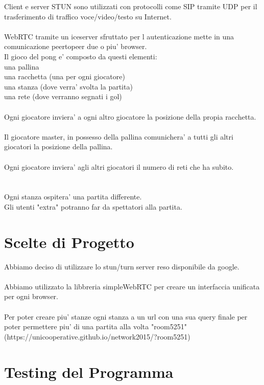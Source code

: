 \documentclass[11pt, a4paper, titlepage, block]{article}
\begin{document}
Client e server STUN sono utilizzati con protocolli come SIP tramite UDP per il trasferimento di traffico voce/video/testo su Internet.\\
\\

WebRTC tramite un iceserver sfruttato per l autenticazione mette in una comunicazione peertopeer due o piu' browser.\\
Il gioco del pong e' composto da questi elementi:\\
una pallina\\
una racchetta (una per ogni giocatore)\\
una stanza (dove verra' svolta la partita)\\
una rete (dove verranno segnati i gol)\\
\\
Ogni giocatore inviera' a ogni altro giocatore la posizione della propia racchetta.\\
\\
Il giocatore master, in possesso della pallina comunichera' a tutti gli altri giocatori la posizione della pallina.\\
\\
Ogni giocatore inviera' agli altri giocatori il numero di reti che ha subito.\\
\\
\\
Ogni stanza ospitera' una partita differente.\\
Gli utenti "extra" potranno far da spettatori alla partita.\\

\section{Scelte di Progetto}
	Abbiamo deciso di utilizzare lo stun/turn server reso disponibile da google.\\
	\\
	Abbiamo utilizzato la libbreria simpleWebRTC per creare un interfaccia unificata per ogni browser.\\
	\\
	Per poter creare piu' stanze ogni stanza a un url con una sua query finale per poter permettere piu' di una 	partita alla volta "room5251"\\ (https://unicooperative.github.io/network2015/?room5251)
\newpage
\section{Testing del Programma}
\end{document}

